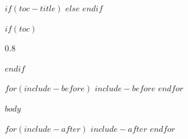 \documentclass[10pt]{article}
\newcommand{\styledtoc}{%
  {\hypersetup{linkcolor=AccentPrimary}%
   \setcounter{tocdepth}{2}%
   \setlength{\parskip}{0pt}%
   \begin{spacing}{0.8}\tableofcontents\end{spacing}%
   \vspace{1em}}%
  \newpage}
\begin{document}
$if(toc-title)$
  \renewcommand{\contentsname}{\color{AccentPrimary}\Large $toc-title$}
$else$
  \renewcommand{\contentsname}{\color{AccentPrimary}\Large Contents}
$endif$


\setcounter{secnumdepth}{0}

$if(toc)$
\styledtoc
$endif$

$for(include-before)$
$include-before$
$endfor$

$body$

$for(include-after)$
$include-after$
$endfor$
\end{document}
